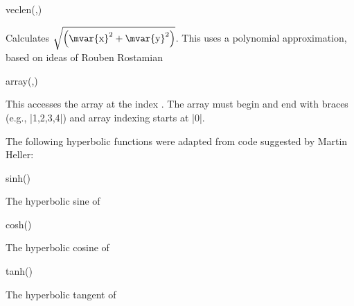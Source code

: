 \begin{math-function}{veclen(,)}
\mathcommand

 Calculates $\sqrt{\left(\textrm{\mvar{x}}^2+\textrm{\mvar{y}}^2\right)}$.
 This uses a polynomial approximation, based on ideas of Rouben Rostamian
\begin{codeexample}[]
 \pgfmathresult
\end{codeexample}

\end{math-function}





\begin{math-function}{array(,)}
\mathcommand

	This accesses the array  at the index . The
	array must begin and end with braces (e.g., |{1,2,3,4}|) and
	array indexing starts at |0|.
	
\begin{codeexample}[]
 \pgfmathresult
\end{codeexample}

\end{math-function}


The following hyperbolic functions were adapted from code
suggested by Martin Heller:

\begin{math-function}{sinh()}
\mathcommand

	The hyperbolic sine of %
	
\begin{codeexample}[]
 \pgfmathresult
\end{codeexample}

\end{math-function}

\begin{math-function}{cosh()}
\mathcommand

	The hyperbolic cosine of %
	
\begin{codeexample}[]
 \pgfmathresult
\end{codeexample}

\end{math-function}

\begin{math-function}{tanh()}
\mathcommand

	The hyperbolic tangent of %
	
\begin{codeexample}[]
 \pgfmathresult
\end{codeexample}

\end{math-function}

